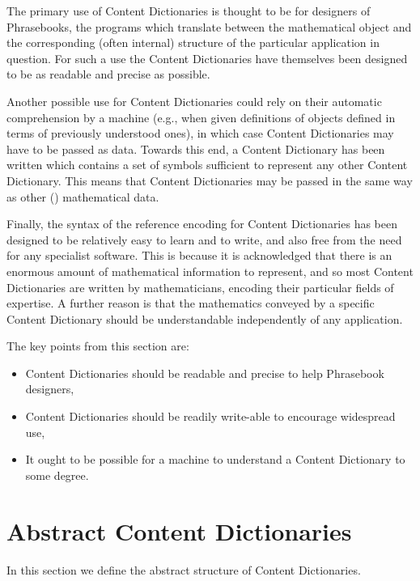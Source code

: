 The primary use of Content Dictionaries is thought to be for designers of Phrasebooks, the
programs which translate between the \OM mathematical object and the corresponding (often
internal) structure of the particular application in question. For such a use the Content
Dictionaries have themselves been designed to be as readable and precise as possible.
    
Another possible use for \OM Content Dictionaries could rely on their automatic
comprehension by a machine (e.g., when given definitions of objects defined in terms of
previously understood ones), in which case Content Dictionaries may have to be passed as
data. Towards this end, a Content Dictionary has been written which contains a set of
symbols sufficient to represent any other Content Dictionary. This means that Content
Dictionaries may be passed in the same way as other (\OM) mathematical data.
    
Finally, the syntax of the reference encoding for Content Dictionaries has been designed
to be relatively easy to learn and to write, and also free from the need for any
specialist software. This is because it is acknowledged that there is an enormous amount
of mathematical information to represent, and so most Content Dictionaries are written by
 mathematicians, encoding their particular fields of expertise.  A
further reason is that the mathematics conveyed by a specific Content Dictionary should be
understandable independently of any application.
    
The key points from this section are:
\begin{itemize}
\item Content Dictionaries should be readable and precise to help Phrasebook designers,
\item Content Dictionaries should be readily write-able to encourage widespread use,
\item It ought to be possible for a machine to understand a Content Dictionary to some
  degree.
\end{itemize}
  
\section{Abstract Content Dictionaries}\label{sect_func}
    
In this section we define the abstract structure of Content Dictionaries.
    
